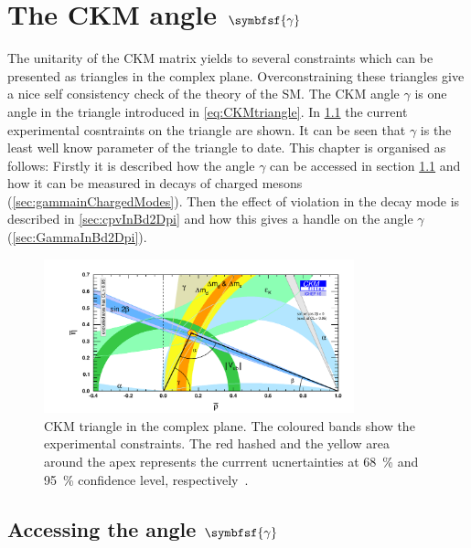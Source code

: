 \chapter[head={The CKM angle $\gamma$},tocentry={The CKM angle $\symbfsf{\gamma}$}]{The CKM angle $\symbfsf{\gamma}$}
\label{ch:CKMAngleGamma}

The unitarity of the CKM matrix yields to several constraints which can be presented as triangles in the complex plane.
Overconstraining these triangles give a nice self consistency check of the theory of the \ac{SM}.
The CKM angle $\gamma$ is one angle in the triangle introduced in \cref{eq:CKMtriangle}.
In \cref{fig:ckmtriangle} the current experimental cosntraints on the triangle are shown.
It can be seen that $\gamma$ is the least well know parameter of the triangle to date.
This chapter is organised as follows: Firstly it is described how the angle $\gamma$ can be accessed in section \cref{sec:accessGamma} and how it can be measured in decays of charged \B mesons (\cref{sec:gammainChargedModes}).
Then the effect of \CP violation in the decay mode \BdToDpi is described in \cref{sec:cpvInBd2Dpi} and how this gives a handle on the angle $\gamma$ (\cref{sec:GammaInBd2Dpi}).

\begin{figure}[tbp]
	\centering
	\includegraphics[width=0.8\textwidth]{04gamma/figs/CKMTriangle.pdf}
	\caption{CKM triangle in the complex plane.
	The coloured bands show the experimental constraints.
	The red hashed and the yellow area around the apex represents the currrent ucnertainties at \SI{68}{\percent} and \SI{95}{\percent} confidence level, respectively~\cite{CKMfitter2005}.}
	\label{fig:ckmtriangle}
\end{figure}

\section[head={Accessing the angle $\gamma$},tocentry={Accessing the angle $\gamma$}]{Accessing the angle $\symbfsf{\gamma}$}
\label{sec:accessGamma}

